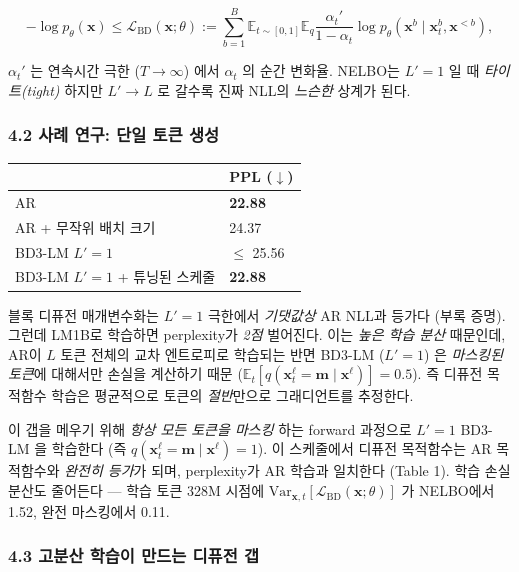 \documentclass[
]{article}
\begin{document}
\[
-\log p_\theta(\mathbf{x}) \le \mathcal{L}_\text{BD}(\mathbf{x}; \theta) := \sum_{b=1}^{B} \mathbb{E}_{t \sim [0,1]} \mathbb{E}_q \frac{\alpha_t'}{1-\alpha_t} \log p_\theta(\mathbf{x}^b \mid \mathbf{x}^b_t, \mathbf{x}^{< b}),
\]

\(\alpha_t'\) 는 연속시간 극한 (\(T \to \infty\)) 에서 \(\alpha_t\) 의
순간 변화율. NELBO는 \(L'=1\) 일 때 \emph{타이트(tight)} 하지만
\(L' \to L\) 로 갈수록 진짜 NLL의 \emph{느슨한} 상계가 된다.

\hypertarget{uxc0acuxb840-uxc5f0uxad6c-uxb2e8uxc77c-uxd1a0uxd070-uxc0dduxc131}{%
\subsubsection{4.2 사례 연구: 단일 토큰
생성}\label{uxc0acuxb840-uxc5f0uxad6c-uxb2e8uxc77c-uxd1a0uxd070-uxc0dduxc131}}

\begin{longtable}[]{@{}ll@{}}
\toprule()
& PPL (\(\downarrow\)) \\
\midrule()
\endhead
AR & \textbf{22.88} \\
AR + 무작위 배치 크기 & 24.37 \\
BD3-LM \(L'=1\) & \(\le\) 25.56 \\
BD3-LM \(L'=1\) + 튜닝된 스케줄 & \textbf{22.88} \\
\bottomrule()
\end{longtable}

블록 디퓨전 매개변수화는 \(L'=1\) 극한에서 \emph{기댓값상} AR NLL과
등가다 (부록 증명). 그런데 LM1B로 학습하면 perplexity가 \emph{2점}
벌어진다. 이는 \emph{높은 학습 분산} 때문인데, AR이 \(L\) 토큰 전체의
교차 엔트로피로 학습되는 반면 BD3-LM (\(L'=1\)) 은 \emph{마스킹된
토큰}에 대해서만 손실을 계산하기 때문
(\(\mathbb{E}_t [q(\mathbf{x}^\ell_t = \mathbf{m} \mid \mathbf{x}^\ell)] = 0.5\)).
즉 디퓨전 목적함수 학습은 평균적으로 토큰의 \emph{절반}만으로
그래디언트를 추정한다.

이 갭을 메우기 위해 \emph{항상 모든 토큰을 마스킹} 하는 forward 과정으로
\(L'=1\) BD3-LM 을 학습한다 (즉
\(q(\mathbf{x}^\ell_t = \mathbf{m} \mid \mathbf{x}^\ell) = 1\)). 이
스케줄에서 디퓨전 목적함수는 AR 목적함수와 \emph{완전히 등가}가 되며,
perplexity가 AR 학습과 일치한다 (Table 1). 학습 손실 분산도 줄어든다 ---
학습 토큰 328M 시점에
\(\text{Var}_{\mathbf{x}, t}[\mathcal{L}_\text{BD}(\mathbf{x}; \theta)]\)
가 NELBO에서 1.52, 완전 마스킹에서 0.11.

\hypertarget{uxace0uxbd84uxc0b0-uxd559uxc2b5uxc774-uxb9ccuxb4dcuxb294-uxb514uxd4e8uxc804-uxac2d}{%
\subsubsection{4.3 고분산 학습이 만드는 디퓨전
갭}\label{uxace0uxbd84uxc0b0-uxd559uxc2b5uxc774-uxb9ccuxb4dcuxb294-uxb514uxd4e8uxc804-uxac2d}}
\end{document}
